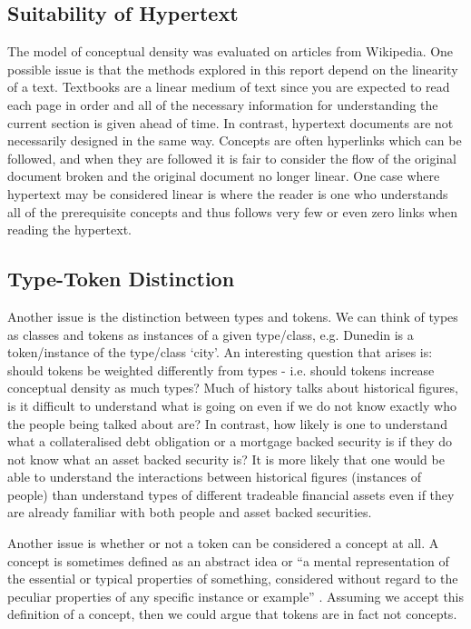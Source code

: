 \documentclass[12pt]{article}
\theoremstyle{grammarstyle}
\begin{document}
\subsection{Suitability of Hypertext}
The model of conceptual density was evaluated on articles from Wikipedia. One possible issue is that the methods explored in this report depend on the linearity of a text. Textbooks are a linear medium of text since you are expected to read each page in order and all of the necessary information for understanding the current section is given ahead of time. In contrast, hypertext documents are not necessarily designed in the same way. Concepts are often hyperlinks which can be followed, and when they are followed it is fair to consider the flow of the original document broken and the original document no longer linear. One case where hypertext may be considered linear is where the reader is one who understands all of the prerequisite concepts and thus follows very few or even zero links when reading the hypertext.

\subsection{Type-Token Distinction}
Another issue is the distinction between types and tokens. We can think of types as classes and tokens as instances of a given type/class, e.g. Dunedin is a token/instance of the type/class `city'. An interesting question that arises is: should tokens be weighted differently from types - i.e. should tokens increase conceptual density as much types? Much of history talks about historical figures, is it difficult to understand what is going on even if we do not know exactly who the people being talked about are? In contrast, how likely is one to understand what a collateralised debt obligation or a mortgage backed security is if they do not know what an asset backed security is? It is more likely that one would be able to understand the interactions between historical figures (instances of people) than understand types of different tradeable financial assets even if they are already familiar with both people and asset backed securities.

Another issue is whether or not a token can be considered a concept at all. A concept is sometimes defined as an abstract idea or ``a mental representation of the essential or typical properties of something, considered without regard to the peculiar properties of any specific instance or example'' \citep{oxford_concept}. Assuming we accept this definition of a concept, then we could argue that tokens are in fact not concepts.
\end{document}
